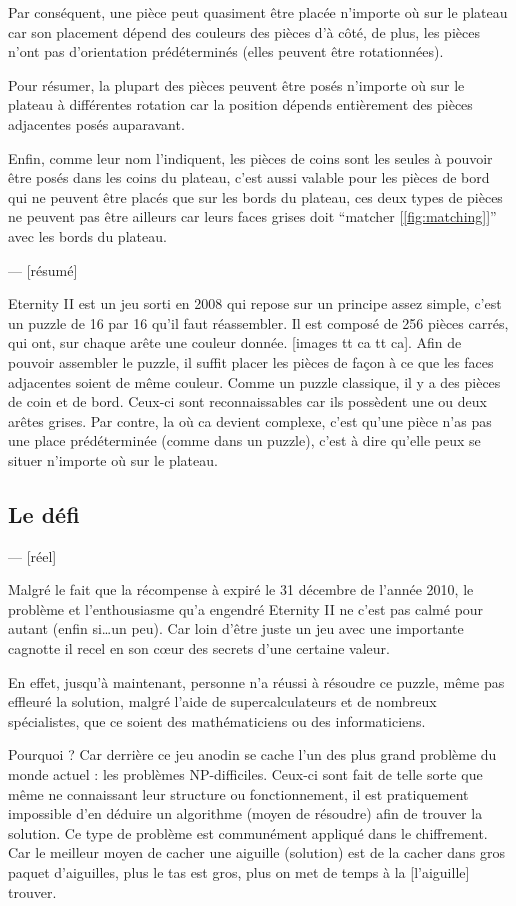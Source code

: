 	Par conséquent, une pièce peut quasiment être placée n'importe où sur le plateau car son placement dépend des couleurs des pièces d'à côté, de plus, les pièces n'ont pas d'orientation prédéterminés (elles peuvent être rotationnées).
	
	Pour résumer, la plupart des pièces peuvent être posés n'importe où sur le plateau à différentes rotation car la position dépends entièrement des pièces adjacentes posés auparavant. 
	
	Enfin, comme leur nom l'indiquent, les pièces de coins sont les seules à pouvoir être posés dans les coins du plateau, c'est aussi valable pour les pièces de bord qui ne peuvent être placés que sur les bords du plateau, ces deux types de pièces ne peuvent pas être ailleurs car leurs faces grises doit \enquote{matcher [\autoref{fig:matching}]} avec les bords du plateau.
	
		--- [résumé]
	
	Eternity II est un jeu sorti en 2008 qui repose sur un principe assez simple, c'est un puzzle de 16 par 16 qu'il faut réassembler. Il est composé de 256 pièces carrés, qui ont, sur chaque arête une couleur donnée. [images tt ca tt ca]. Afin de pouvoir assembler le puzzle, il suffit placer les pièces de façon à ce que les faces adjacentes soient de même couleur. Comme un puzzle classique, il y a des pièces de coin et de bord. Ceux-ci sont reconnaissables car ils possèdent une ou deux arêtes grises. Par contre, la où ca devient complexe, c'est qu'une pièce n'as pas une place prédéterminée (comme dans un puzzle), c'est à dire qu'elle peux se situer n'importe où sur le plateau. 
	
	\newpage
	\subsection{Le défi}
	--- [réel]
	
	Malgré le fait que la récompense à expiré le 31 décembre de l'année 2010, le problème et l'enthousiasme qu'a engendré Eternity II ne c'est pas calmé pour autant (enfin si\dots un peu). Car loin d'être juste un jeu avec une importante cagnotte il recel en son c\oe ur des secrets d'une certaine valeur.
	
	En effet, jusqu'à maintenant, personne n'a réussi à résoudre ce puzzle, même pas effleuré la solution, malgré l'aide de supercalculateurs et de nombreux spécialistes, que ce soient des mathématiciens ou des informaticiens.
	
	Pourquoi ? Car derrière ce jeu anodin se cache l'un des plus grand problème du monde actuel : les problèmes NP-difficiles. Ceux-ci sont fait de telle sorte que même ne connaissant leur structure ou fonctionnement, il est pratiquement impossible d'en déduire un algorithme (moyen de résoudre) afin de trouver la solution. Ce type de problème est communément appliqué dans le chiffrement. Car le meilleur moyen de cacher une aiguille (solution) est de la cacher dans gros paquet d'aiguilles, plus le tas est gros, plus on met de temps à la [l'aiguille] trouver.
	
